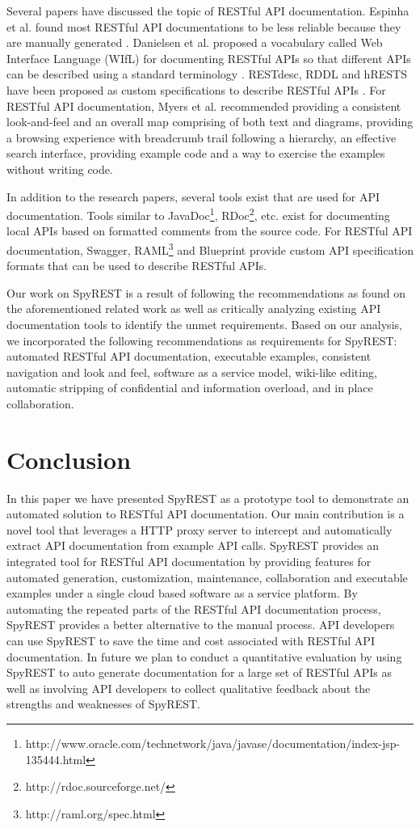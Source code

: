\documentclass[conference]{IEEEtran}
\begin{document}
Several papers have discussed the topic of RESTful API documentation. Espinha et al. found most RESTful API documentations to be less reliable because they are manually generated \cite{Espinha_web}. Danielsen et al. proposed a vocabulary called Web Interface Language (WIfL) for documenting RESTful APIs so that different APIs can be described using a standard terminology \cite{Danielsen_validation}. RESTdesc, RDDL and hRESTS have been proposed as custom specifications to describe RESTful APIs \cite{Verborgh_functional, Mangler_rddl, Kopecky_hrests}. For RESTful API documentation, Myers et al. recommended providing a consistent look-and-feel and an overall map comprising of both text and diagrams, providing a browsing experience with breadcrumb trail following a hierarchy, an effective search interface, providing example code and a way to exercise the examples without writing code.

In addition to the research papers, several tools exist that are used for API documentation. Tools similar to JavaDoc\footnote{http://www.oracle.com/technetwork/java/javase/documentation/index-jsp-135444.html}, RDoc\footnote{http://rdoc.sourceforge.net/}, etc. exist for documenting local APIs based on formatted comments from the source code. For RESTful API documentation, Swagger, RAML\footnote{http://raml.org/spec.html} and Blueprint provide custom API specification formats that can be used to describe RESTful APIs.

Our work on SpyREST is a result of following the recommendations as found on the aforementioned related work as well as critically analyzing existing API documentation tools to identify the unmet requirements. Based on our analysis, we incorporated the following recommendations as requirements for SpyREST: automated RESTful API documentation, executable examples, consistent navigation and look and feel, software as a service model, wiki-like editing, automatic stripping of confidential and information overload, and in place collaboration.

\section{Conclusion}
In this paper we have presented SpyREST as a prototype tool to demonstrate an automated solution to RESTful API documentation. Our main contribution is a novel tool that leverages a HTTP proxy server to intercept and automatically extract API documentation from example API calls. SpyREST provides an integrated tool for RESTful API documentation by providing features for automated generation, customization, maintenance, collaboration and executable examples under a single cloud based software as a service platform. By automating the repeated parts of the RESTful API documentation process, SpyREST provides a better alternative to the manual process. API developers can use SpyREST to save the time and cost associated with RESTful API documentation. In future we plan to conduct a quantitative evaluation by using SpyREST to auto generate documentation for a large set of RESTful APIs as well as involving API developers to collect qualitative feedback about the strengths and weaknesses of SpyREST.



\end{document}
